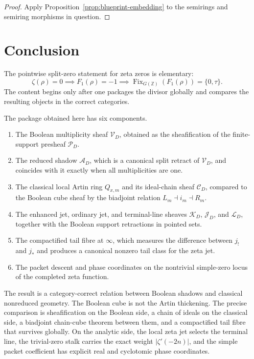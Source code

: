 \documentclass[11pt,a4paper]{article}
\theoremstyle{definition}
\theoremstyle{remark}
\DeclareMathOperator{\Fix}{Fix}
\newcommand{\ZZ}{\mathbb Z}
\newcommand{\taup}{\tau}
\newcommand{\Vd}{\mathcal V_D}
\newcommand{\Ad}{\mathcal A_D}
\newcommand{\Pd}{\mathcal P_D}
\newcommand{\Cd}{\mathcal C_D}
\newcommand{\Jd}{\mathcal J_D}
\newcommand{\Kd}{\mathcal K_D}
\newcommand{\Ld}{\mathcal L_D}
\begin{document}
\begin{proof}
Apply Proposition~\ref{prop:blueprint-embedding} to the semirings and semiring morphisms in question.
\end{proof}

\section{Conclusion}

The pointwise split-zero statement for zeta zeros is elementary:
\[
\zeta(\rho)=0\implies F_1(\rho)=-1\implies \Fix_{G(\ZZ)}(F_1(\rho))=\{0,\taup\}.
\]
The content begins only after one packages the divisor globally and compares the resulting objects in the correct categories.

The package obtained here has six components.
\begin{enumerate}[label=(\roman*)]
\item The Boolean multiplicity sheaf $\Vd$, obtained as the sheafification of the finite-support presheaf $\Pd$.
\item The reduced shadow $\Ad$, which is a canonical split retract of $\Vd$, and coincides with it exactly when all multiplicities are one.
\item The classical local Artin ring $Q_{x,m}$ and its ideal-chain sheaf $\Cd$, compared to the Boolean cube sheaf by the biadjoint relation $L_m\dashv i_m\dashv R_m$.
\item The enhanced jet, ordinary jet, and terminal-line sheaves $\Kd$, $\Jd$, and $\Ld$, together with the Boolean support retractions in pointed sets.
\item The compactified tail fibre at $\infty$, which measures the difference between $j_!$ and $j_*$ and produces a canonical nonzero tail class for the zeta jet.
\item The packet descent and phase coordinates on the nontrivial simple-zero locus of the completed zeta function.
\end{enumerate}

The result is a category-correct relation between Boolean shadows and classical nonreduced geometry. The Boolean cube is not the Artin thickening. The precise comparison is sheafification on the Boolean side, a chain of ideals on the classical side, a biadjoint chain-cube theorem between them, and a compactified tail fibre that survives globally. On the analytic side, the local zeta jet selects the terminal line, the trivial-zero stalk carries the exact weight $|\zeta'(-2n)|$, and the simple packet coefficient has explicit real and cyclotomic phase coordinates.
\end{document}
